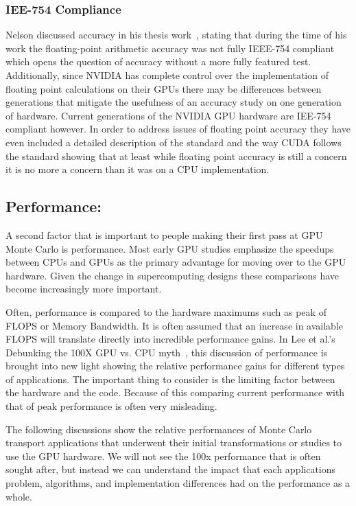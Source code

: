 \subsubsection*{ \textbf{IEE-754 Compliance} }
Nelson discussed accuracy in his thesis work~\cite{nelson2009monte}, stating that during the time of his work the floating-point arithmetic accuracy was not fully IEEE-754 compliant which opens the question of accuracy without a more fully featured test. 
%
Additionally, since NVIDIA has complete control over the implementation of floating point calculations on their GPUs there may be differences between generations that mitigate the usefulness of an accuracy study on one generation of hardware.
%
Current generations of the NVIDIA GPU hardware are IEE-754 compliant however. 
%
In order to address issues of floating point accuracy they have even included a detailed description of the standard and the way CUDA follows the standard showing that at least while floating point accuracy is still a concern it is no more a concern than it was on a CPU implementation.~\cite{cudaToolkitv7.5}
%

\subsection*{\textbf{Performance:}}

A second factor that is important to people making their first pass at GPU Monte Carlo is performance.
%
Most early GPU studies emphasize the speedups between CPUs and GPUs as the primary advantage for moving over to the GPU hardware.
%
Given the change in supercomputing designs these comparisons have become increasingly more important.
%

%
Often, performance is compared to the hardware maximums such as peak of FLOPS or Memory Bandwidth.
%
It is often assumed that an increase in available FLOPS will translate directly into incredible performance gains.
%
In Lee et al.'s Debunking the 100X GPU vs. CPU myth~\cite{lee2010debunking}, this discussion of performance is brought into new light showing the relative performance gains for different types of applications.
%
The important thing to consider is the limiting factor between the hardware and the code.
%
Because of this comparing current performance with that of peak performance is often very misleading.
%

%
The following discussions show the relative performances of Monte Carlo transport applications that underwent their initial transformations or studies to use the GPU hardware.
%
We will not see the 100x performance that is often sought after, but instead we can understand the impact that each applications problem, algorithms, and implementation differences had on the performance as a whole.
%

